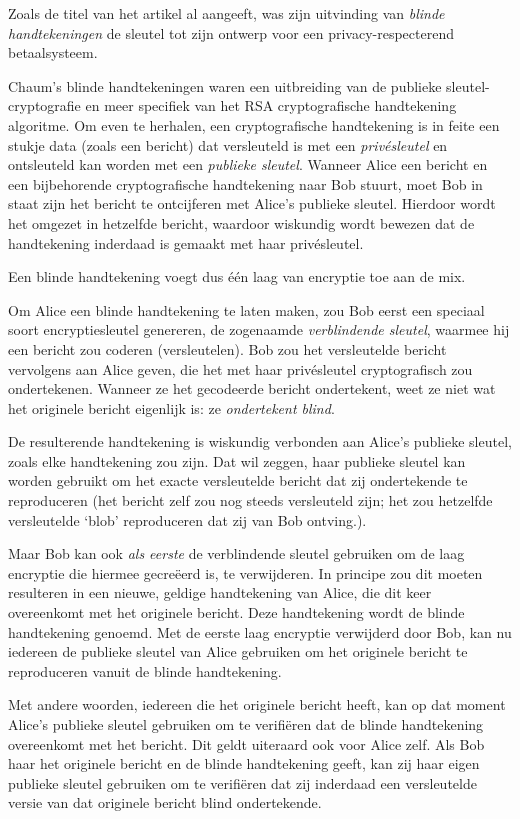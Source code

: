 \documentclass[smalldemyvopaper,11pt,twoside,onecolumn,openright,extrafontsizes,hidelinks]{memoir}
\begin{document}
Zoals de titel van het artikel al aangeeft, was zijn uitvinding van
\emph{blinde handtekeningen} de sleutel tot zijn ontwerp voor een
privacy-respecterend betaalsysteem.

Chaum's blinde handtekeningen waren een uitbreiding van de publieke
sleutel-cryptografie en meer specifiek van het RSA cryptografische
handtekening algoritme. Om even te herhalen, een cryptografische
handtekening is in feite een stukje data (zoals een bericht) dat
versleuteld is met een \emph{privésleutel} en ontsleuteld kan worden met
een \emph{publieke sleutel}. Wanneer Alice een bericht en een
bijbehorende cryptografische handtekening naar Bob stuurt, moet Bob in
staat zijn het bericht te ontcijferen met Alice's publieke sleutel.
Hierdoor wordt het omgezet in hetzelfde bericht, waardoor wiskundig
wordt bewezen dat de handtekening inderdaad is gemaakt met haar
privésleutel.

Een blinde handtekening voegt dus één laag van encryptie toe aan de mix.

Om Alice een blinde handtekening te laten maken, zou Bob eerst een
speciaal soort encryptiesleutel genereren, de zogenaamde
\emph{verblindende sleutel}, waarmee hij een bericht zou coderen
(versleutelen). Bob zou het versleutelde bericht vervolgens aan Alice
geven, die het met haar privésleutel cryptografisch zou ondertekenen.
Wanneer ze het gecodeerde bericht ondertekent, weet ze niet wat het
originele bericht eigenlijk is: ze \emph{ondertekent blind}.

De resulterende handtekening is wiskundig verbonden aan Alice's publieke
sleutel, zoals elke handtekening zou zijn. Dat wil zeggen, haar publieke
sleutel kan worden gebruikt om het exacte versleutelde bericht dat zij
ondertekende te reproduceren (het bericht zelf zou nog steeds
versleuteld zijn; het zou hetzelfde versleutelde `blob' reproduceren dat
zij van Bob ontving.).

Maar Bob kan ook \emph{als eerste} de verblindende sleutel gebruiken om
de laag encryptie die hiermee gecreëerd is, te verwijderen. In principe
zou dit moeten resulteren in een nieuwe, geldige handtekening van Alice,
die dit keer overeenkomt met het originele bericht. Deze handtekening
wordt de blinde handtekening genoemd. Met de eerste laag encryptie
verwijderd door Bob, kan nu iedereen de publieke sleutel van Alice
gebruiken om het originele bericht te reproduceren vanuit de blinde
handtekening.

Met andere woorden, iedereen die het originele bericht heeft, kan op dat
moment Alice's publieke sleutel gebruiken om te verifiëren dat de blinde
handtekening overeenkomt met het bericht. Dit geldt uiteraard ook voor
Alice zelf. Als Bob haar het originele bericht en de blinde handtekening
geeft, kan zij haar eigen publieke sleutel gebruiken om te verifiëren
dat zij inderdaad een versleutelde versie van dat originele bericht
blind ondertekende.
\end{document}
